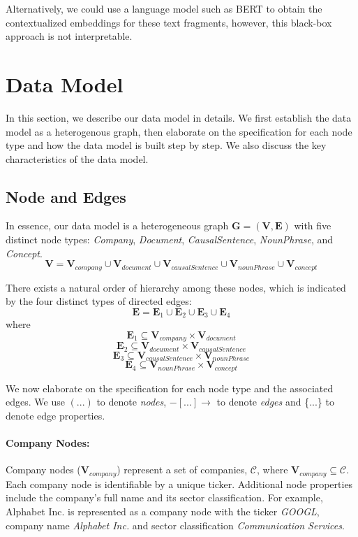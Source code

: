 \documentclass [
     12pt,         %
     a4paper,      %
     BCOR10mm,     %
     DIV14,        %
     liststotoc,   %
     bibtotoc,     %
     idxtotoc,     %
     parskip       %
     ]{scrreprt}
\begin{document}
Alternatively, we could use a language model such as BERT to obtain the contextualized embeddings for these text fragments, however, this black-box approach is not interpretable. 




\section{Data Model} \label{sec:datamodel}

In this section, we describe our data model in details. We first establish the data model as a heterogenous graph, then elaborate on the specification for each node type and how the data model is built step by step. We also discuss the key characteristics of the data model. 

\subsection{Node and Edges}

In essence, our data model is a heterogeneous graph $\mathbf{G} = (\mathbf{V}, \mathbf{E})$ with five distinct node types: \emph{Company}, \emph{Document}, \emph{CausalSentence}, \emph{NounPhrase}, and \emph{Concept}.
\[\mathbf{V} = \mathbf{V}_{company} \cup \mathbf{V}_{document} \cup \mathbf{V}_{causalSentence} \cup \mathbf{V}_{nounPhrase} \cup \mathbf{V}_{concept} \]

There exists a natural order of hierarchy among these nodes, which is indicated by the four distinct types of directed edges:
\[\mathbf{E} = \mathbf{E}_1 \cup \mathbf{E}_2 \cup \mathbf{E}_3 \cup \mathbf{E}_4 \] where 
\[\mathbf{E}_1 \subseteq \mathbf{V}_{company} \times \mathbf{V}_{document} \]
\[\mathbf{E}_2 \subseteq \mathbf{V}_{document} \times \mathbf{V}_{causalSentence} \]
\[\mathbf{E}_3 \subseteq \mathbf{V}_{causalSentence} \times \mathbf{V}_{nounPhrase} \]
\[\mathbf{E}_4 \subseteq \mathbf{V}_{nounPhrase} \times \mathbf{V}_{concept} \]


We now elaborate on the specification for each node type and the associated edges. We use $(...)$ to denote \emph{nodes}, $-[...]\rightarrow$ to denote \emph{edges} and \{...\} to denote edge properties.


\paragraph{Company Nodes:} Company nodes ($\mathbf{V}_{company}$) represent a set of companies, $\mathcal{C}$, where $\mathbf{V}_{company} \subseteq \mathbf{\mathcal{C}}$. Each company node is identifiable by a unique ticker. Additional node properties include the company's full name and its sector classification. For example, Alphabet Inc. is represented as a company node with the ticker \emph{GOOGL}, company name \emph{Alphabet Inc.} and sector classification \emph{Communication Services}.  
\end{document}
